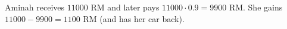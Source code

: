 Aminah receives $11000$ RM and later pays $11000\cdot0.9=9900$ RM. She gains $11000-9900=\boxed{1100}$ RM (and has her car back).

